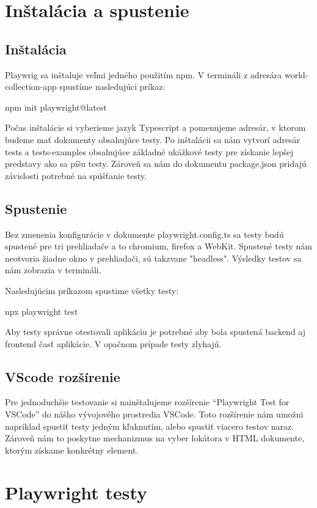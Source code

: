 \section{Inštalácia a spustenie }
\subsection*{Inštalácia}
Playwrig sa inštaluje veľmi jedného použitím npm. V termináli z adresára  world-collection-app spustíme nasledujúci príkaz: 
\begin{code}
      npm init playwright@latest
\end{code}

Počas inštalácie si vyberieme jazyk Typescript a pomenujeme adresár, v ktorom budeme mať dokumenty obsahujúce testy. 
Po inštalácii sa nám vytvorí adresár tests a tests-examples obsahujúce základné ukážkové testy pre získanie lepšej predstavy ako sa píšu testy.  
Zároveň sa nám do dokumentu package.json pridajú závislosti potrebné na spúšťanie testy. 

\subsection*{Spustenie}
Bez zmenenia konfigurácie v dokumente playwright.config.ts sa testy budú spustené pre tri prehliadače a to chromium, firefox a WebKit. Spustené testy nám neotvoria žiadne okno v prehliadači, sú takzvane "headless". 
Výsledky testov sa nám zobrazia v termináli. 

Nasledujúcim príkazom spustime všetky testy: 
\begin{code}
      npx playwright test
\end{code}

Aby testy správne otestovali aplikáciu je potrebné aby bola spustená backend aj frontend časť aplikácie. 
V opačnom prípade testy zlyhajú. 

\subsection*{VScode rozšírenie}
Pre jednoduchšie testovanie si nainštalujeme rozšírenie “Playwright Test for VSCode” do nášho vývojového prostredia VSCode. 
Toto rozšírenie nám umožni napríklad spustiť testy jedným kľuknutím, alebo spustiť viacero testov naraz. Zároveň nám to poskytne mechanizmus na vyber lokátora v HTML dokumente, ktorým získame konkrétny element. 


\section{Playwright testy}
